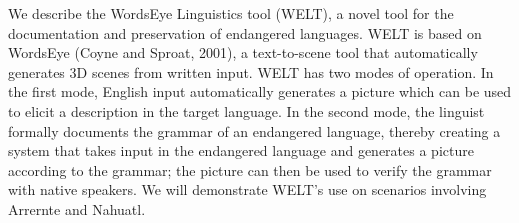 We describe the WordsEye Linguistics tool (WELT), a novel tool for the documentation and preservation of endangered languages. WELT is based on WordsEye (Coyne and Sproat, 2001), a text-to-scene tool that automatically generates 3D scenes from written input. WELT has two modes of operation. In the first mode, English input automatically generates a picture which can be used to elicit a description in the target language. In the second mode, the linguist formally documents the grammar of an endangered language, thereby creating a system that takes input in the endangered language and generates a picture according to the grammar; the picture can then be used to verify the grammar with native speakers. We will demonstrate WELT's use on scenarios involving Arrernte and Nahuatl.
